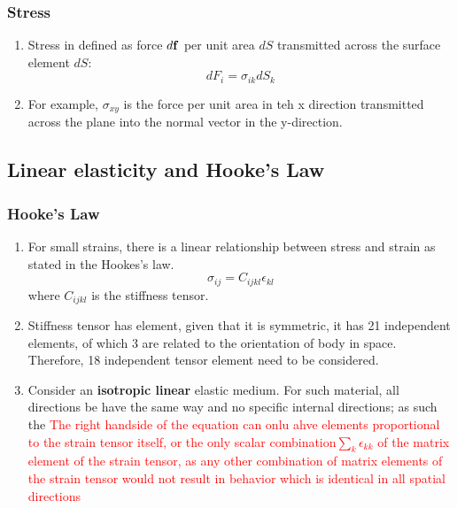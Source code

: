 \documentclass[12pt,a4paper]{article}
\begin{document}
    \subsubsection{Stress}
        \begin{enumerate}
            \item Stress in defined as force $d\vb{f}$ per unit area $dS$ transmitted across the surface element $dS$:
            \begin{equation}
                dF_i=\sigma_{ik} dS_k
            \end{equation}
            \item For example, $\sigma_{xy}$ is the force per unit area in teh x direction transmitted across the plane into the normal vector in the y-direction.
        \end{enumerate}
\subsection{Linear elasticity and Hooke's Law}
    \subsubsection{Hooke's Law}
        \begin{enumerate}
            \item For small strains, there is a linear relationship between stress and strain as stated in the Hookes's law. 
            \begin{equation}
                \sigma_{ij}=C_{ijkl}\epsilon_{kl}
            \end{equation}
            where $C_{ijkl}$ is the stiffness tensor.
            \item Stiffness tensor has element, given that it is symmetric, it has 21 independent elements, of which 3 are related to the orientation of body in space. Therefore, 18 independent tensor element need to be considered.
            \item Consider an \textbf{isotropic linear} elastic medium. For such material, all directions be have the same way and no specific internal directions; as such the \textcolor{red}{The right handside of the equation can onlu ahve elements proportional to the strain tensor itself, or the only scalar combination$\sum_{k}\epsilon_{kk}$ of the matrix element of the strain tensor, as any other combination of matrix elements of the strain tensor would not result in behavior which is identical in all spatial directions}
        \end{enumerate}
\end{document}

